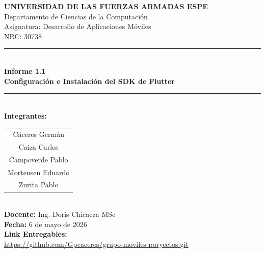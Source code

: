 \documentclass[12pt,a4paper]{article}
\begin{document}

\thispagestyle{portada}
\singlespacing
\setlength{\parskip}{0pt}
\vspace*{1.2cm}
\begin{center}
  {\Large\bfseries\color{espeblue}
    UNIVERSIDAD DE LAS FUERZAS ARMADAS ESPE\\[0.3cm]}
  {\large\color{espeblue}
    Departamento de Ciencias de la Computación\\[0.2cm]
    Asignatura: Desarrollo de Aplicaciones Móviles\\[0.2cm]
    NRC: 30738\\[0.6cm]}
  \textcolor{espeblue}{\rule{\linewidth}{1.5pt}}\\[0.4cm]
  {\LARGE\bfseries\color{espeblue}
    Informe 1.1\\[0.25cm]
    Configuración e Instalación del SDK de Flutter\\[0.35cm]}
  \textcolor{espeblue}{\rule{\linewidth}{1.5pt}}\\[1.0cm]
  {\large\bfseries Integrantes:}\\[0.4cm]
  \begin{tabular}{c}
    Cáceres Germán\\[0.15cm]
    Caiza Carlos\\[0.15cm]
    Campoverde Pablo\\[0.15cm]
    Mortensen Eduardo\\[0.15cm]
    Zurita Pablo\\
  \end{tabular}\\[1.5cm]
  {\large\textbf{Docente:} Ing. Doris Chicacza MSc}\\[0.35cm]
  {\large\textbf{Fecha:} 6 de mayo de 2026}\\[0.35cm]
  
  {\large\textbf{Link Entregables:}}\\[0.35cm]
  {\large\url{https://github.com/Gpcaceres/grupo-moviles-poryectos.git}}\\[0.35cm]
\end{center}


\newpage
{}

\tableofcontents
\end{document}
